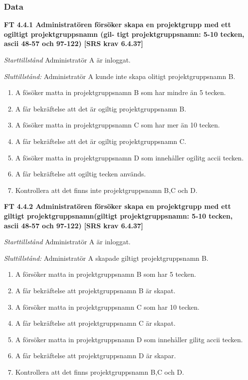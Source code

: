 \documentclass[a4paper]{article}
\begin{document}
\subsubsection{Data}
\textbf{FT 4.4.1 Administratören försöker skapa en projektgrupp med ett ogiltigt projektgruppsnamn (gil- tigt projektgruppsnamn: 5-10 tecken, ascii 48-57 och 97-122) [SRS krav 6.4.37]}

\emph{Starttillstånd} Administratör A  är inloggat.

\emph{Sluttillstånd:} Administratör A kunde inte skapa olitigt projektgruppsnamn B.

\begin{enumerate}
\item A fösöker matta in projektgruppsnamn B som har mindre än 5 tecken.
\item A får bekräftelse att det är ogiltig projektgruppsnamn B.
\item A fösöker matta in projektgruppsnamn C som har mer än 10 tecken.
\item A får bekräftelse att det är ogiltig projektgruppsnamn C.
\item A fösöker matta in projektgruppsnamn D som innehåller ogilitg accii tecken.
\item A får bekräftelse att ogiltig tecken används.
\item Kontrollera att det finns inte  projektgruppsnamn B,C och D.

\end{enumerate}

\textbf{FT 4.4.2 Administratören försöker skapa en projektgrupp med ett giltigt projektgruppsnamn(giltigt projektgruppsnamn: 5-10 tecken, ascii 48-57 och 97-122) [SRS krav 6.4.37]}

\emph{Starttillstånd} Administratör A  är inloggat.

\emph{Sluttillstånd:} Administratör A  skapade  giltigt projektgruppsnamn B.

\begin{enumerate}
\item A försöker matta in projektgruppsnamn B som har 5 tecken.
\item A får bekräftelse att projektgruppsnamn B är skapat.
\item A försöker matta in projektgruppsnamn C som har 10 tecken.
\item A får bekräftelse att projektgruppsnamn C är skapat.
\item A försöker matta in projektgruppsnamn D som innehåller gilitg accii tecken.
\item A får bekräftelse att projektgruppsnamn D är skapar.
\item Kontrollera att det finns  projektgruppsnamn B,C och D.
\end{enumerate}
\end{document}
